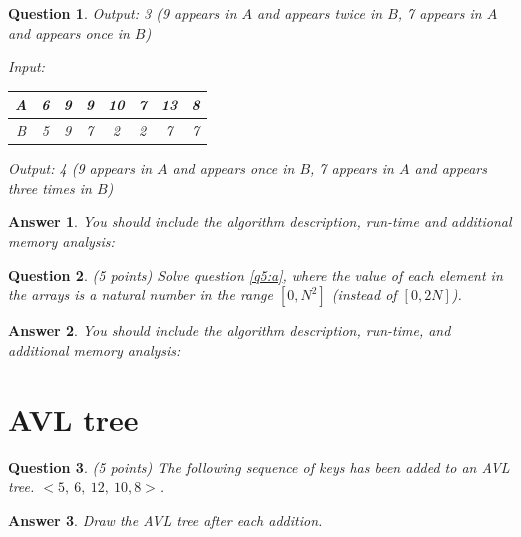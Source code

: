 \documentclass[a4paper]{article}
\theoremstyle{remarksStyle}
\theoremstyle{questionStyle}
\newtheorem{question}{Question}
\theoremstyle{answerStyle}
\newtheorem{answer}{Answer}
\begin{document}
\begin{question}
\vspace{0.5cm}
Output:  3 \hspace{1cm} (\textit{9 appears in $A$ and appears twice in $B$,  7 appears in $A$  and appears once in $B$})


\vspace{1cm}
Input:
\begin{tabular}{|c || c | c  | c | c | c | c | c ||} 
 \hline
 A & 6 & 9 & 9 & 10 & 7 & 13 & 8  \\ 
 \hline
 B & 5 & 9 & 7 & 2 & 2 & 7 & 7  \\ 
 \hline
\end{tabular}

\vspace{0.5cm}
Output:  4 \hspace{1cm} (\textit{9 appears in $A$ and appears once in $B$,  7 appears in $A$  and appears three times in $B$})










\end{question}

\vspace{0.5 cm}

\begin{answer}
    You should include the algorithm description, run-time and additional memory analysis:
\end{answer}

\vspace{0.75 cm}

\begin{question} \label{q6} (5 points)
Solve question \ref{q5:a}, where the value of each element in the arrays is a natural number in the range $[0,N^2]$ (instead of $[0, 2N]$).
\end{question}

\vspace{0.5 cm}

\begin{answer}
    You should include the algorithm description, run-time, and additional memory analysis:
\end{answer}

\newpage
\section{AVL tree}
\begin{question} (5 points)
The following sequence of keys has been added to an AVL tree.
$< 5, \ 6, \ 12, \ 10, 8 >$. 
\end{question}
\begin{answer}
Draw the AVL tree after each addition.

\end{answer}
\end{document}
